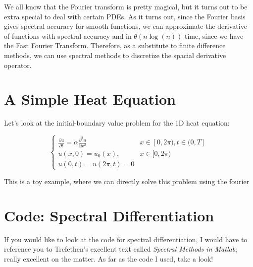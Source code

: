 \documentclass[12pt]{article}
\begin{document}
We all know that the Fourier transform is pretty magical, but it turns out to be
extra special to deal with certain PDEs. As it turns out, since the Fourier
basis gives spectral accuracy for smooth functions, we can approximate the
derivative of functions with spectral accuracy and in $\theta(n\log(n))$ time,
since we have the Fast Fourier Transform. Therefore, as a substitute to finite
difference methods, we can use spectral methods to discretize the spacial
derivative operator.

\section{A Simple Heat Equation}

Let's look at the initial-boundary value problem for the 1D heat equation:

$$
\begin{cases}
  \frac{\partial u}{\partial t} = \alpha \frac{\partial^2 u}{\partial x^2}
  & x \in [0, 2\pi), t \in (0, T] \\
  u(x,0) = u_0(x), & x \in [0, 2\pi) \\
  u(0,t) = u(2\pi, t) = 0
\end{cases}
$$

This is a toy example, where we can directly solve this problem using the
fourier

\section{Code: Spectral Differentiation}

If you would like to look at the code for spectral differentiation, I would have
to reference you to Trefethen's excellent text called \textit{Spectral Methods
in Matlab}; really excellent on the matter. As far as the code I used, take
a look!

\inputminted[fontsize=\footnotesize, linenos]{c}{./code/spectral_diff.h}
\end{document}
